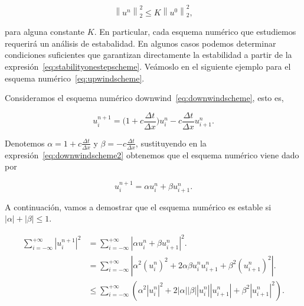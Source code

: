 \begin{equation}\label{eq:stabilityonestepschemeequivalence}
  {\left\|u^{n}\right\|}^{2}_{2}\leq
  K
  {\left\|u^{0}\right\|}^{2}_{2},
\end{equation}

para alguna constante $K$.
En particular, cada esquema numérico que estudiemos requerirá
un análisis de estabalidad. En algunos casos podemos determinar
condiciones suficientes que garantizan directamente la estabilidad a
partir de la expresión~\eqref{eq:stabilityonestepscheme}.
Veámoslo en el siguiente ejemplo para el esquema
numérico~\eqref{eq:upwindscheme}.

\begin{example}
  Consideramos el esquema numérico
  downwind~\eqref{eq:downwindscheme}, esto es,

  \begin{equation}\label{eq:downwindscheme2}
    u^{n+1}_{i}=
    \big(
    1+
    c\frac{\Delta t}{\Delta x}
    \big)
    u^{n}_{i}-
    c\frac{\Delta t}{\Delta x}
    u^{n}_{i+1}.
  \end{equation}

  Denotemos
  \begin{math}
    \alpha=
    1+
    c\frac{\Delta t}{\Delta x}
  \end{math}
  y
  \begin{math}
    \beta=
    -c\frac{\Delta t}{\Delta x}
  \end{math},
  sustituyendo en la expresión~\eqref{eq:downwindscheme2} obtenemos
  que el esquema numérico viene dado por

  \begin{equation*}
    u^{n+1}_{i}=
    \alpha u^{n}_{i}+
    \beta u^{n}_{i+1}.
  \end{equation*}

  A continuación, vamos a demostrar que el esquema numérico es
  estable si
  \begin{math}
    \left|\alpha\right|+
    \left|\beta\right|\leq
    1
  \end{math}.

  \begin{align*}
    \sum_{i=-\infty}^{+\infty}
    {\left|u^{n+1}_{i}\right|}^{2} & =
    \sum_{i=-\infty}^{+\infty}
    {
    \left|\alpha u^{n}_{i}+
    \beta u^{n}_{i+1}\right|
    }^{2}.                                \\
                                   & =
    \sum_{i=-\infty}^{+\infty}
    \left|
    \alpha^{2}
    {\left(u^{n}_{i}\right)}^{2}+
    2\alpha\beta
    u^{n}_{i}
    u^{n}_{i+1}+
    \beta^{2}
    {\left(u^{n}_{i+1}\right)}^{2}
    \right|.                              \\
                                   & \leq
    \sum_{i=-\infty}^{+\infty}
    \left(
    \alpha^{2}
    {\left|u^{n}_{i}\right|}^{2}+
    2\left|\alpha\right|
    \left|\beta\right|
    \left|u^{n}_{i}\right|
    \left|u^{n}_{i+1}\right|+
    \beta^{2}
    {\left|u^{n}_{i+1}\right|}^{2}
    \right).
  \end{align*}


\end{example}
